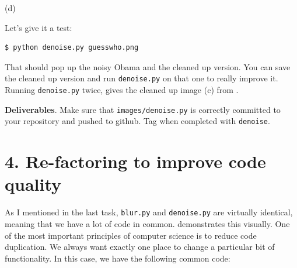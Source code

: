 \begin{marginfigure}
\begin{center}
(d) 
\end{center}
\label{obama}
\end{marginfigure}


Let's give it a test:

\begin{lstlisting}[style=BashInputStyle]
$ python denoise.py guesswho.png
\end{lstlisting}

\noindent That should pop up the noisy Obama and the cleaned up version. You can save the cleaned up version and run {\tt denoise.py} on that one to really improve it. Running {\tt denoise.py} twice, gives the cleaned up image (c) from .  

\begin{callout}{\bcplume}
{\bf Deliverables}. Make sure that {\tt images/denoise.py} is correctly committed to your repository and pushed to github. Tag when completed with {\tt denoise}.
\end{callout}

\vspace{10mm}
\section{4. Re-factoring to improve code quality}

As I mentioned in the last task, {\tt blur.py} and {\tt denoise.py} are virtually identical, meaning that we have a lot of code in common.  demonstrates this visually. One of the most important principles of computer science is to reduce code duplication. We always want exactly one place to change a particular bit of functionality.   In this case, we have the following common code:

